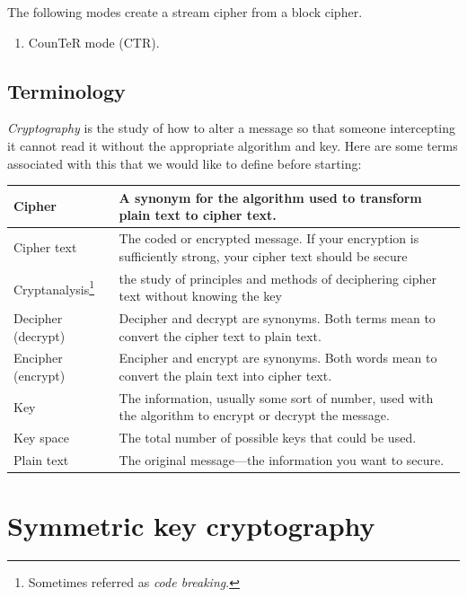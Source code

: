 \documentclass[a4paper, 12pt]{book} %
\begin{document}
The following modes create a stream cipher from a block cipher. 
\begin{enumerate}
    \item CounTeR mode (CTR).
\end{enumerate}








\section{Terminology}
\emph{Cryptography} is the study of how to alter a message so that someone intercepting it cannot read it without the appropriate algorithm and key. Here are some terms associated with this that we would like to define before starting:
\begin{longtable}{|l|p{10cm}|} \hline 
    Cipher & A synonym for the algorithm used to transform plain text to cipher text. \\  \hline 
    Cipher text & The coded or encrypted message. If your encryption is sufficiently strong, your cipher text should be secure  \\ \hline 
    Cryptanalysis\footnote{Sometimes referred as \emph{code breaking}.} & the study of principles and methods of deciphering cipher text without knowing the key \\ \hline 
    Decipher (decrypt) & Decipher and decrypt are synonyms. Both terms mean to convert the cipher text to plain text. \\ \hline 
    Encipher (encrypt) &  Encipher and encrypt are synonyms. Both words mean to convert the plain text into cipher text. \\ \hline 
    Key & The information, usually some sort of number, used with the algorithm to encrypt or decrypt the message.  \\ \hline 
    Key space  & The total number of possible keys that could be used. \\ \hline 
    Plain text & The original message—the information you want to secure. \\ \hline 
\end{longtable}














\chapter{Symmetric key cryptography}
\end{document}
